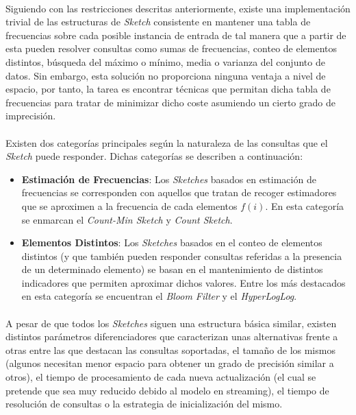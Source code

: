 \documentclass{subfiles}
\begin{document}
        \paragraph{}
        Siguiendo con las restricciones descritas anteriormente, existe una implementación trivial de las estructuras de \emph{Sketch} consistente en mantener una tabla de frecuencias sobre cada posible instancia de entrada de tal manera que a partir de esta pueden resolver consultas como sumas de frecuencias, conteo de elementos distintos, búsqueda del máximo o mínimo, media o varianza del conjunto de datos. Sin embargo, esta solución no proporciona ninguna ventaja a nivel de espacio, por tanto, la tarea es encontrar técnicas que permitan  dicha tabla de frecuencias para tratar de minimizar dicho coste asumiendo un cierto grado de imprecisión.

        \paragraph{}
        Existen dos categorías principales según la naturaleza de las consultas que el \emph{Sketch} puede responder. Dichas categorías se describen a continuación:

        \begin{itemize}

          \item \textbf{Estimación de Frecuencias}: Los \emph{Sketches} basados en estimación de frecuencias se corresponden con aquellos que tratan de recoger estimadores que se aproximen a la frecuencia de cada elementos $f(i)$. En esta categoría se enmarcan el \emph{Count-Min Sketch} y \emph{Count Sketch}.

          \item \textbf{Elementos Distintos}: Los \emph{Sketches} basados en el conteo de elementos distintos (y que también pueden responder consultas referidas a la presencia de un determinado elemento) se basan en el mantenimiento de distintos indicadores que permiten aproximar dichos valores. Entre los más destacados en esta categoría se encuentran el \emph{Bloom Filter} y el \emph{HyperLogLog}.

        \end{itemize}

        \paragraph{}
        A pesar de que todos los \emph{Sketches} siguen una estructura básica similar, existen distintos parámetros diferenciadores que caracterizan unas alternativas frente a otras entre las que destacan las consultas soportadas, el tamaño de los mismos (algunos necesitan menor espacio para obtener un grado de precisión similar a otros), el tiempo de procesamiento de cada nueva actualización (el cual se pretende que sea muy reducido debido al modelo en streaming), el tiempo de resolución de consultas o la estrategia de inicialización del mismo.
\end{document}
